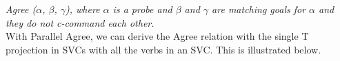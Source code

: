 \documentclass[output=paper,colorlinks,citecolor=brown]{langscibook}
\begin{document}
\z
\begin{center}
\end{center}
\emph{Agree ($\alpha$, $\beta$, $\gamma$), where $\alpha$ is a probe and $\beta$ and  $\gamma$ are matching goals for $\alpha$ and they do not c-command each other.}\\

With Parallel Agree, we can derive the Agree relation with the single T projection in SVCs with all the verbs in an SVC. This is illustrated below. 
\end{document}
